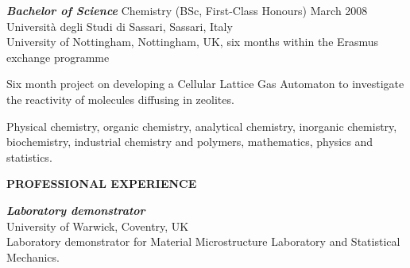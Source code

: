 \documentclass[a4paper,10pt,final]{memoir}
\newcommand{\Sep}{\vspace{1.em}}
\newcommand{\SmallSep}{\vspace{0.3em}}
\newcommand{\CVSection}[1]
	{\Large\textbf{#1}\par
	\SmallSep\normalsize\normalfont}
\newcommand{\CVItem}[2]
	{\textit{\textbf{\color{RoyalBlue} #1}} #2}
\begin{document}
\CVItem{Bachelor of Science}{Chemistry (BSc, First-Class Honours) \hfill  March 2008}\\
Universit\`a degli Studi di Sassari, Sassari, Italy\\
University of Nottingham, Nottingham, UK, six months within the Erasmus exchange programme  %
\begin{description} [style=multiline,leftmargin=3cm,font=\normalfont] \itemsep -2pt
\item [Thesis:] Six month project on developing a Cellular Lattice Gas Automaton to investigate
the reactivity of molecules diffusing in zeolites.
\item[Main subjects:] Physical chemistry, organic chemistry, analytical chemistry,
  inorganic chemistry, biochemistry, industrial chemistry and polymers, mathematics,
  physics and statistics. 
\end{description}

\Sep
\CVSection{PROFESSIONAL EXPERIENCE} 
\CVItem{Laboratory demonstrator} \\ %
University of Warwick, Coventry, UK  \\
Laboratory demonstrator for Material Microstructure Laboratory and Statistical Mechanics. 
\end{document}
